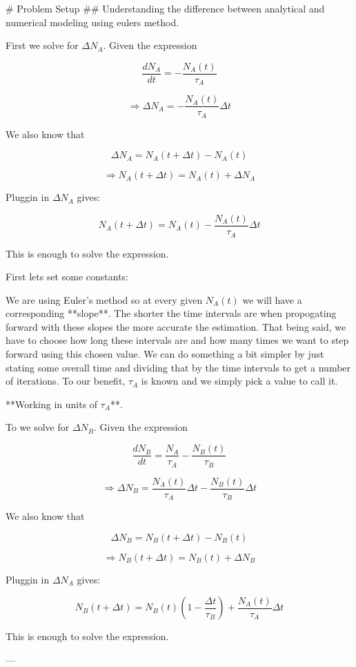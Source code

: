 # Problem Setup
## Understanding the difference between analytical and numerical modeling using eulers method.

First we solve for $\Delta N_{A}$. Given the expression 



$$\frac{dN_{A}}{dt} = - \frac{N_{A}(t)}{\tau_{A}}$$

$$\Rightarrow \Delta N_{A} = - \frac{N_{A}(t)}{\tau_{A}}\Delta t$$

We also know that 

$$\Delta N_{A} = N_{A}(t+\Delta t) - N_{A}(t)$$

$$\Rightarrow  N_{A}(t+\Delta t)  = N_{A}(t) +\Delta N_{A} $$

Pluggin in $\Delta N_{A}$ gives:

$$\boxed{N_{A}(t+\Delta t) = N_{A}(t) - \frac{N_{A}(t)}{\tau_{A}}\Delta t}$$

This is enough to solve the expression.

First lets set some constants:

We are using Euler's method so at every given $N_{A}(t)$ we will have a corresponding **slope**. The shorter the time intervals are when propogating forward with these slopes the more accurate the estimation. That being said, we have to choose how long these intervals are and how many times we want to step forward using this chosen value. We can do something a bit simpler by just stating some overall time and dividing that by the time intervals to get a number of iterations. To our benefit, $\tau_{A}$ is known and we simply pick a value to call it. 

**Working in units of $\tau_{A}$**.



To we solve for $\Delta N_{B}$. Given the expression 



$$\frac{dN_{B}}{dt} = \frac{N_{A}}{\tau_{A}}- \frac{N_{B}(t)}{\tau_{B}}$$ 

$$\Rightarrow \Delta N_{B} = \frac{N_{A}(t)}{\tau_{A}}\Delta t - \frac{N_{B}(t)}{\tau_{B}}\Delta t$$

We also know that 

$$\Delta N_{B} = N_{B}(t+\Delta t) - N_{B}(t)$$

$$\Rightarrow  N_{B}(t+\Delta t)  = N_{B}(t) +\Delta N_{B} $$

Pluggin in $\Delta N_{A}$ gives:

$$\boxed{N_{B}(t+\Delta t) = N_{B}(t)\left(1-\frac{\Delta t}{\tau_{B}}\right) + \frac{N_{A}(t)}{\tau_{A}}\Delta t}$$

This is enough to solve the expression.



---
